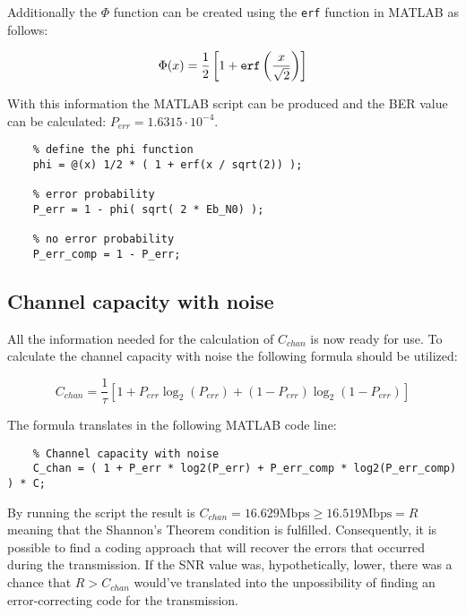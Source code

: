 \noindent Additionally the $\Phi$ function can be created using the \texttt{erf} function in MATLAB as follows:

\begin{equation*}
    \Phi(x) = \frac{1}{2} \left[ 1 + \text{\texttt{erf}} \left( \frac{x}{\sqrt{2}} \right) \right]
\end{equation*}

\noindent With this information the MATLAB script can be produced and the BER value can be calculated: $P_{err} = 1.6315 \cdot 10^{-4} $.

\begin{lstlisting}
    % define the phi function
    phi = @(x) 1/2 * ( 1 + erf(x / sqrt(2)) );

    % error probability
    P_err = 1 - phi( sqrt( 2 * Eb_N0) ); 

    % no error probability
    P_err_comp = 1 - P_err; 
\end{lstlisting}


\subsection{Channel capacity with noise}
All the information needed for the calculation of $C_{chan}$ is now ready for use. To calculate the channel capacity with noise the following formula should be utilized:

\begin{equation*}
    C_{chan} = \frac{1}{\tau}\left[ 1 + P_{err}\log_2\left( P_{err} \right) + \left( 1 - P_{err} \right)\log_2 \left(  1 - P_{err} \right) \right] 
\end{equation*}

\noindent The formula translates in the following MATLAB code line:

\begin{lstlisting}
    % Channel capacity with noise
    C_chan = ( 1 + P_err * log2(P_err) + P_err_comp * log2(P_err_comp) ) * C;
\end{lstlisting}

\noindent By running the script the result is $C_{chan} = 16.629 \text{Mbps} \geq 16.519 \text{Mbps} = R$ meaning that the Shannon's Theorem condition is fulfilled. Consequently, it is possible to find a coding approach that will recover the errors that occurred during the transmission. If the SNR value was, hypothetically, lower, there was a chance that $R > C_{chan}$ would've translated into the unpossibility of finding an error-correcting code for the transmission.
